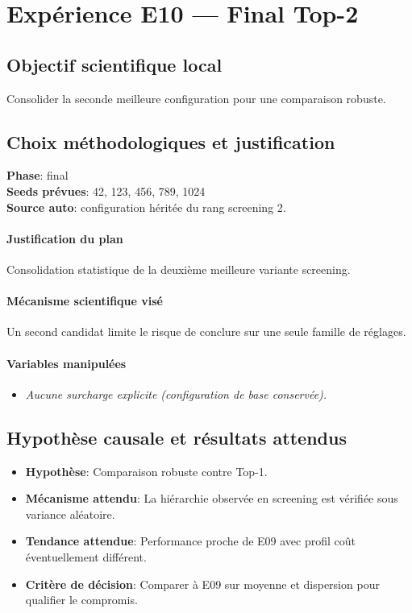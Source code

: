 \documentclass[11pt,a4paper]{article}
\begin{document}
\section{Expérience E10 --- Final Top-2}
\subsection{Objectif scientifique local}
Consolider la seconde meilleure configuration pour une comparaison robuste.

\subsection{Choix méthodologiques et justification}
\textbf{Phase}: final\\
\textbf{Seeds prévues}: 42, 123, 456, 789, 1024\\
\textbf{Source auto}: configuration héritée du rang screening 2.

\paragraph{Justification du plan}
Consolidation statistique de la deuxième meilleure variante screening.

\paragraph{Mécanisme scientifique visé}
Un second candidat limite le risque de conclure sur une seule famille de réglages.

\paragraph{Variables manipulées}
\begin{itemize}
\item \textit{Aucune surcharge explicite (configuration de base conservée).}
\end{itemize}

\subsection{Hypothèse causale et résultats attendus}
\begin{itemize}[leftmargin=1.2cm]
\item \textbf{Hypothèse}: Comparaison robuste contre Top-1.
\item \textbf{Mécanisme attendu}: La hiérarchie observée en screening est vérifiée sous variance aléatoire.
\item \textbf{Tendance attendue}: Performance proche de E09 avec profil coût éventuellement différent.
\item \textbf{Critère de décision}: Comparer à E09 sur moyenne et dispersion pour qualifier le compromis.
\end{itemize}
\end{document}
